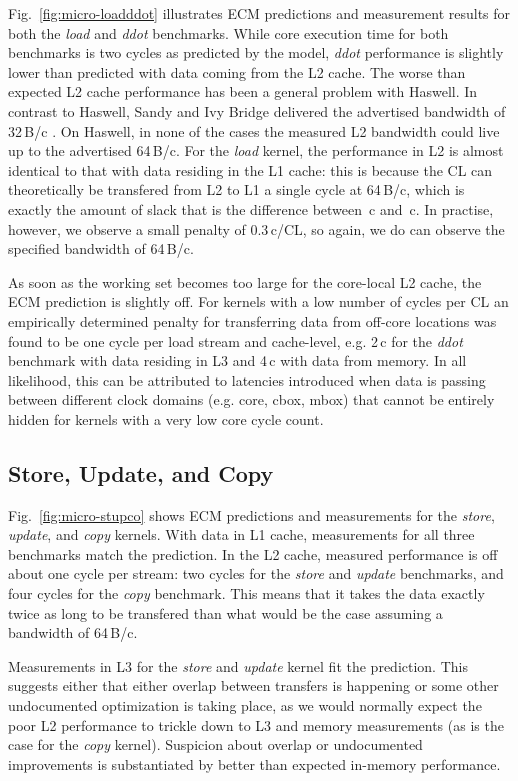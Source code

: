 \documentclass{llncs}
\begin{document}
Fig.~\ref{fig:micro-loadddot} illustrates ECM predictions and measurement
results for both the \textit{load} and \textit{ddot} benchmarks. While core
execution time for both benchmarks is two cycles as predicted by the model,
\textit{ddot} performance is slightly lower than predicted with data coming
from the L2 cache. The worse than expected L2 cache performance has been a
general problem with Haswell. In contrast to Haswell, Sandy and Ivy Bridge
delivered the advertised bandwidth of 32\,B/c \cite{sthw15}. On Haswell, in
none of the cases the measured L2 bandwidth could live up to the advertised
64\,B/c.  For the \textit{load} kernel, the performance in L2 is almost
identical to that with data residing in the L1 cache: this is because the CL
can theoretically be transfered from L2 to L1 a single cycle at 64\,B/c, which
is exactly the amount of slack that is the difference between
\,c and \,c. In practise, however, we
observe a small penalty of 0.3\,c/CL, so again, we do can observe the specified
bandwidth of 64\,B/c.

As soon as the working set becomes too large for the core-local L2 cache, the
ECM prediction is slightly off. For kernels with a low number of cycles per CL
an empirically determined penalty for transferring data from off-core locations
was found to be one cycle per load stream and cache-level, e.g.  2\,c for the
\textit{ddot} benchmark with data residing in L3 and 4\,c with data from
memory. In all likelihood, this can be attributed to latencies introduced when
data is passing between different clock domains (e.g. core, cbox, mbox) that
cannot be entirely hidden for kernels with a very low core cycle count.

\subsection{Store, Update, and Copy}

Fig.~\ref{fig:micro-stupco} shows ECM predictions and measurements for the
\textit{store}, \textit{update}, and \textit{copy} kernels. With data in L1
cache, measurements for all three benchmarks match the prediction. In the L2
cache, measured performance is off about one cycle per stream: two cycles for
the \textit{store} and \textit{update} benchmarks, and four cycles for the
\textit{copy} benchmark. This means that it takes the data exactly twice as
long to be transfered than what would be the case assuming a bandwidth of
64\,B/c.

Measurements in L3 for the \textit{store} and \textit{update} kernel fit the
prediction. This suggests either that either overlap between transfers is
happening or some other undocumented optimization is taking place, as we would
normally expect the poor L2 performance to trickle down to L3 and memory
measurements (as is the case for the \textit{copy} kernel). Suspicion about
overlap or undocumented improvements is substantiated by better than expected
in-memory performance.
\end{document}

